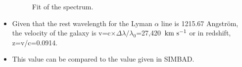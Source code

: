 \documentclass [a4paper, 12pt]{article}
\def\kms{\rm km\ s^{-1}}
\newcommand{\simbad}{{\textsc{SIMBAD}}}
\begin{document}
\begin{itemize}
\begin{figure}[H]
\caption{Fit of the spectrum.}
\label{fig:specfit}
\end{figure}
\item Given that the rest wavelength for the Lyman $\alpha$ line is 1215.67 Angstr\"om, the velocity of the galaxy is v=c$\times\Delta\lambda/\lambda_0$=27,420~$\kms$ or in redshift, z=v/c=0.0914.

\item This value can be compared to the value given in \simbad.
\end{itemize}
 
%
\end{document}
